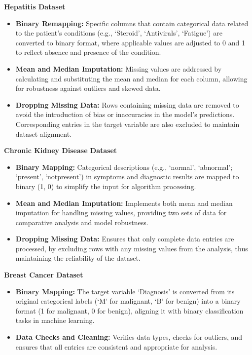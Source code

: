 \documentclass[11pt]{article}
\providecommand{\tightlist}{%
      \setlength{\itemsep}{0pt}\setlength{\parskip}{0pt}}
\begin{document}
\textbf{Hepatitis Dataset}

\begin{itemize}
\tightlist
\item
  \textbf{Binary Remapping:} Specific columns that contain categorical
  data related to the patient's conditions (e.g., `Steroid',
  `Antivirals', `Fatigue') are converted to binary format, where
  applicable values are adjusted to 0 and 1 to reflect absence and
  presence of the condition.
\item
  \textbf{Mean and Median Imputation:} Missing values are addressed by
  calculating and substituting the mean and median for each column,
  allowing for robustness against outliers and skewed data.
\item
  \textbf{Dropping Missing Data:} Rows containing missing data are
  removed to avoid the introduction of bias or inaccuracies in the
  model's predictions. Corresponding entries in the target variable are
  also excluded to maintain dataset alignment.
\end{itemize}

\textbf{Chronic Kidney Disease Dataset}

\begin{itemize}
\tightlist
\item
  \textbf{Binary Mapping:} Categorical descriptions (e.g., `normal',
  `abnormal'; `present', `notpresent') in symptoms and diagnostic
  results are mapped to binary (1, 0) to simplify the input for
  algorithm processing.
\item
  \textbf{Mean and Median Imputation:} Implements both mean and median
  imputation for handling missing values, providing two sets of data for
  comparative analysis and model robustness.
\item
  \textbf{Dropping Missing Data:} Ensures that only complete data
  entries are processed, by excluding rows with any missing values from
  the analysis, thus maintaining the reliability of the dataset.
\end{itemize}

\textbf{Breast Cancer Dataset}

\begin{itemize}
\tightlist
\item
  \textbf{Binary Mapping:} The target variable `Diagnosis' is converted
  from its original categorical labels (`M' for malignant, `B' for
  benign) into a binary format (1 for malignant, 0 for benign), aligning
  it with binary classification tasks in machine learning.
\item
  \textbf{Data Checks and Cleaning:} Verifies data types, checks for
  outliers, and ensures that all entries are consistent and appropriate
  for analysis.
\end{itemize}
\end{document}
